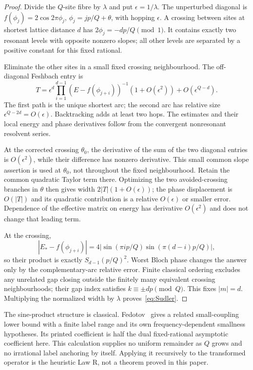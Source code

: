 \begin{proof}
Divide the $Q$-site fibre by $\lambda$ and put $\epsilon=1/\lambda$. The unperturbed diagonal is $f(\phi_j)=2\cos2\pi\phi_j$, $\phi_j=jp/Q+\theta$, with hopping $\epsilon$. A crossing between sites at shortest lattice distance $d$ has $2\phi_j=-dp/Q\pmod1$. It contains exactly two resonant levels with opposite nonzero slopes; all other levels are separated by a positive constant for this fixed rational.

Eliminate the other sites in a small fixed crossing neighbourhood. The off-diagonal Feshbach entry is
\[
 T=\epsilon^d\prod_{i=1}^{d-1}
     (E-f(\phi_{j+i}))^{-1}(1+O(\epsilon^2))
       +O(\epsilon^{Q-d}).
\]
The first path is the unique shortest arc; the second arc has relative size $\epsilon^{Q-2d}=O(\epsilon)$. Backtracking adds at least two hops. The estimates and their local energy and phase derivatives follow from the convergent nonresonant resolvent series.

At the corrected crossing $\theta_0$, the derivative of the sum of the two diagonal entries is $O(\epsilon^2)$, while their difference has nonzero derivative. This small common slope assertion is used at $\theta_0$, not throughout the fixed neighbourhood. Retain the common quadratic Taylor term there. Optimizing the two avoided-crossing branches in $\theta$ then gives width $2|T|(1+O(\epsilon))$; the phase displacement is $O(|T|)$ and its quadratic contribution is a relative $O(\epsilon)$ or smaller error. Dependence of the effective matrix on energy has derivative $O(\epsilon^2)$ and does not change that leading term.

At the crossing,
\[
 |E_*-f(\phi_{j+i})|
 =4|\sin(\pi ip/Q)\sin(\pi(d-i)p/Q)|,
\]
so their product is exactly $S_{d-1}(p/Q)^2$. Worst Bloch phase changes the answer only by the complementary-arc relative error. Finite classical ordering excludes any unrelated gap closing outside the finitely many equivalent crossing neighbourhoods; their gap index satisfies $k\equiv\pm dp\pmod Q$. This fixes $|m|=d$. Multiplying the normalized width by $\lambda$ proves~\eqref{eq:Sudler}.
\end{proof}

The sine-product structure is classical. Fedotov~\cite[Theorem~2.5]{Fedotov} gives a related small-coupling lower bound with a finite label range and its own frequency-dependent smallness hypotheses. Its printed coefficient is half the dual fixed-rational asymptotic coefficient here. This calculation supplies no uniform remainder as $Q$ grows and no irrational label anchoring by itself. Applying it recursively to the transformed operator is the heuristic Law R, not a theorem proved in this paper.

\label{end:limits}
